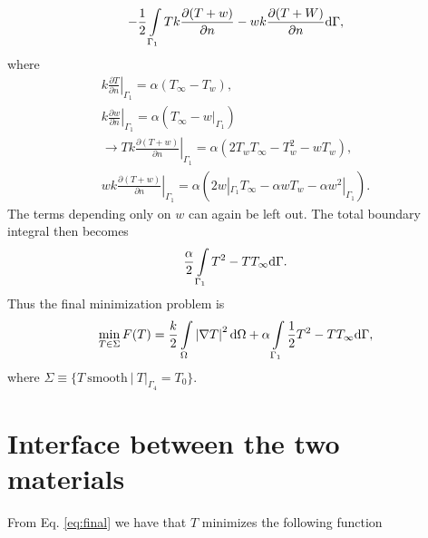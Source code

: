 \begin{gather*}
    -\frac{1}{2}\int\displaylimits_{\Gamma_1} T k \frac{\partial(T+w)}{\partial n} - wk\frac{\partial(T+W)}{\partial n}\mathrm{d}\Gamma,
\end{gather*} where
\begin{gather*}
    k\left.\frac{\partial T}{\partial n}\right|_{\Gamma_1} = \alpha (T_{\infty} - T_w),\\
    k\left.\frac{\partial w}{\partial n}\right|_{\Gamma_1} = \alpha (T_{\infty} - w|_{\Gamma_1})\\
    \rightarrow Tk \left.\frac{\partial(T+w)}{\partial n}\right|_{\Gamma_1} = \alpha\left( 2T_w T_{\infty} - T_w^2 - wT_w \right), \\
    wk \left.\frac{\partial(T+w)}{\partial n}\right|_{\Gamma_1}
    = \alpha\left( 2w|_{\Gamma_1} T_{\infty} - \alpha w T_w - \alpha w^2|_{\Gamma_1} \right).
\end{gather*} The terms depending only on $w$ can again be left out. The total boundary integral then becomes
\begin{gather*}
    \frac{\alpha}{2}\int\displaylimits_{\Gamma_1} T^2 - TT_{\infty} \mathrm{d}\Gamma. 
\end{gather*} Thus the final minimization problem is
\begin{gather}
    \min_{T\in\Sigma} F(T)=\frac{k}{2}\int\displaylimits_{\Omega} \left|\nabla T\right|^2 \mathrm{d}\Omega + \alpha \int\displaylimits_{\Gamma_1} \frac{1}{2}T^2 - TT_{\infty} \mathrm{d}\Gamma,
\label{eq:final}
\end{gather} where $\Sigma \equiv \{ T~\text{smooth}~|~T|_{\Gamma_4}=T_0 \}$.

\section{Interface between the two materials} 

From Eq. \ref{eq:final} we have that $T$ minimizes the following function

